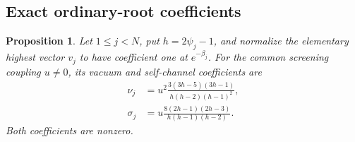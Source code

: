 \documentclass[11pt,a4paper]{article}
\numberwithin{equation}{section}
\newtheorem{proposition}[theorem]{Proposition}
\theoremstyle{definition}\newtheorem{definition}[theorem]{Definition}
\theoremstyle{remark}\newtheorem{remark}[theorem]{Remark}
\begin{document}
\subsection{Exact ordinary-root coefficients}
\begin{proposition}\label{c:ordinary-root-coefficients}
Let $1\le j<N$, put $h=2\psi_j-1$, and normalize the elementary
highest vector $v_j$ to have coefficient one at $e^{-\beta_j}$.
For the common screening coupling $u\ne0$, its vacuum and self-channel
coefficients are
\begin{align}
 \nu_j&=u^2\frac{3(3h-5)(3h-1)}{h(h-2)(h-1)^2},\label{c:ordinary-root-nu}\\
 \sigma_j&=u\frac{8(2h-1)(2h-3)}{h(h-1)(h-2)}.\label{c:ordinary-root-sigma}
\end{align}
Both coefficients are nonzero.
\end{proposition}
\end{document}
